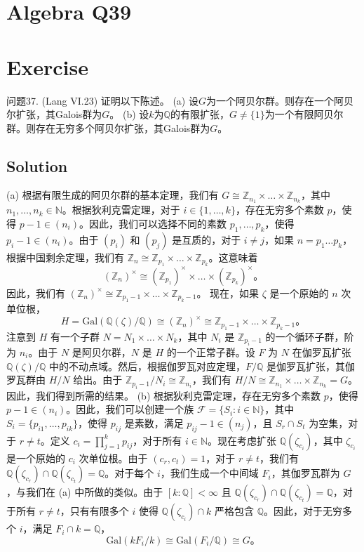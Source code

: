 \documentclass[12pt]{book}
\begin{document}
\section{Algebra Q39}
\section*{Exercise}
问题37. (Lang VI.23) 证明以下陈述。
(a) 设$G$为一个阿贝尔群。则存在一个阿贝尔扩张，其Galois群为$G$。
(b) 设$k$为$\mathbb{Q}$的有限扩张，$G \neq \{1\}$为一个有限阿贝尔群。则存在无穷多个阿贝尔扩张，其Galois群为$G$。



\subsection*{Solution}
(a) 根据有限生成的阿贝尔群的基本定理，我们有 $G \cong \mathbb{Z}_{n_1} \times \dots \times \mathbb{Z}_{n_k}$，其中 $n_1, \dots, n_k \in \mathbb{N}$。根据狄利克雷定理，对于 $i \in \{1, \dots, k\}$，存在无穷多个素数 $p$，使得 $p-1 \in (n_i)$。因此，我们可以选择不同的素数 $p_1, \dots, p_k$，使得 $p_i - 1 \in (n_i)$。由于 $(p_i)$ 和 $(p_j)$ 是互质的，对于 $i \neq j$，如果 $n = p_1 \dots p_k$，根据中国剩余定理，我们有 $\mathbb{Z}_n \cong \mathbb{Z}_{p_1} \times \dots \times \mathbb{Z}_{p_k}$。这意味着
\[ (\mathbb{Z}_n)^\times \cong (\mathbb{Z}_{p_1})^\times \times \dots \times (\mathbb{Z}_{p_k})^\times。 \]
因此，我们有 $(\mathbb{Z}_n)^\times \cong \mathbb{Z}_{p_1-1} \times \dots \times \mathbb{Z}_{p_k-1}$。
现在，如果 $\zeta$ 是一个原始的 $n$ 次单位根，
\[ H = \text{Gal}(\mathbb{Q}(\zeta)/\mathbb{Q}) \cong (\mathbb{Z}_n)^\times \cong \mathbb{Z}_{p_1-1} \times \dots \times \mathbb{Z}_{p_k-1}。 \]
注意到 $H$ 有一个子群 $N = N_1 \times \dots \times N_k$，其中 $N_i$ 是 $\mathbb{Z}_{p_i-1}$ 的一个循环子群，阶为 $n_i$。由于 $N$ 是阿贝尔群，$N$ 是 $H$ 的一个正常子群。设 $F$ 为 $N$ 在伽罗瓦扩张 $\mathbb{Q}(\zeta)/\mathbb{Q}$ 中的不动点域。然后，根据伽罗瓦对应定理，$F/\mathbb{Q}$ 是伽罗瓦扩张，其伽罗瓦群由 $H/N$ 给出。由于 $\mathbb{Z}_{p_i-1}/N_i \cong \mathbb{Z}_{n_i}$，我们有 $H/N \cong \mathbb{Z}_{n_1} \times \dots \times \mathbb{Z}_{n_k} = G$。因此，我们得到所需的结果。
(b) 根据狄利克雷定理，存在无穷多个素数 $p$，使得 $p-1 \in (n_i)$。因此，我们可以创建一个族 $\mathcal{F} = \{S_i : i \in \mathbb{N}\}$，其中 $S_i = \{p_{i1}, \dots, p_{ik}\}$，使得 $p_{ij}$ 是素数，满足 $p_{ij} - 1 \in (n_j)$，且 $S_r \cap S_t$ 为空集，对于 $r \neq t$。定义 $c_i = \prod_{j=1}^k p_{ij}$，对于所有 $i \in \mathbb{N}$。现在考虑扩张 $\mathbb{Q}(\zeta_{c_i})$，其中 $\zeta_{c_i}$ 是一个原始的 $c_i$ 次单位根。由于 $(c_r, c_t) = 1$，对于 $r \neq t$，我们有 $\mathbb{Q}(\zeta_{c_r}) \cap \mathbb{Q}(\zeta_{c_t}) = \mathbb{Q}$。对于每个 $i$，我们生成一个中间域 $F_i$，其伽罗瓦群为 $G$，与我们在 (a) 中所做的类似。由于 $[k : \mathbb{Q}] < \infty$ 且 $\mathbb{Q}(\zeta_{c_r}) \cap \mathbb{Q}(\zeta_{c_t}) = \mathbb{Q}$，对于所有 $r \neq t$，只有有限多个 $i$ 使得 $\mathbb{Q}(\zeta_{c_i}) \cap k$ 严格包含 $\mathbb{Q}$。因此，对于无穷多个 $i$，满足 $F_i \cap k = \mathbb{Q}$，
\[ \text{Gal}(kF_i/k) \cong \text{Gal}(F_i/\mathbb{Q}) \cong G。 \]
\newpage
\end{document}
